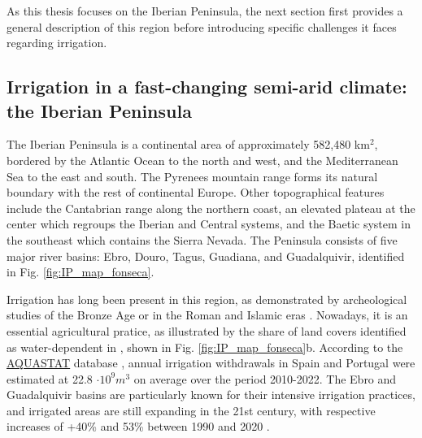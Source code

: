 As this thesis focuses on the Iberian Peninsula, the next section first provides a general description of this region before introducing specific challenges it faces regarding irrigation.

\subsection{Irrigation in a fast-changing semi-arid climate: the Iberian Peninsula}
The Iberian Peninsula is a continental area of approximately 582,480 km$^2$, bordered by the Atlantic Ocean to the north and west, and the Mediterranean Sea to the east and south. The Pyrenees mountain range forms its natural boundary with the rest of continental Europe. Other topographical features include the Cantabrian range along the northern coast, an elevated plateau at the center which regroups the Iberian and Central systems, and the Baetic system in the southeast which contains the Sierra Nevada.
The Peninsula consists of five major river basins: Ebro, Douro, Tagus, Guadiana, and Guadalquivir, identified in Fig. \ref{fig:IP_map_fonseca}.

Irrigation has long been present in this region, as demonstrated by archeological studies of the Bronze Age \citep[2140-1500 BCE, ][]{mora-gonzalez_isotopic_2016} or in the Roman and Islamic eras \citep[250-800, ][]{butzer_irrigation_1985}. 
Nowadays, it is an essential agricultural pratice, as illustrated by the share of land covers identified as water-dependent in \citet{fonseca_agricultural_2022}, shown in Fig. \ref{fig:IP_map_fonseca}b. 
According to the \href{https://data.apps.fao.org/aquastat/?lang=en}{AQUASTAT} database \citep[presented in ][]{frenken_aquastat_2012}, annual irrigation withdrawals in Spain and Portugal were estimated at 22.8 $\cdot 10^{9} m^3$ on average over the period 2010-2022.
The Ebro and Guadalquivir basins are particularly known for their intensive irrigation practices, and irrigated areas are still expanding in the 21st century, with respective increases of +40\% and 53\% between 1990 and 2020 \citep{fonseca_agricultural_2022}. 


